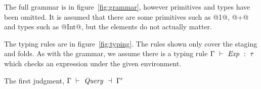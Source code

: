The full grammar is in figure~\ref{fig:grammar}, however primitives and types have been omitted.
It is assumed that there are some primitives such as @1@, @+@ and types such as @Int@, but the elements do not actually matter.

The typing rules are in figure~\ref{fig:typing}.
The rules shown only cover the staging and folds.
As with the grammar, we assume there is a typing rule $\Gamma ~\vdash~ \mathit{Exp}~:~\tau$ which checks an expression under the given environment.

The first judgment, $\TypecheckS{\Gamma}{\mi{Query}}{\Gamma'}$ 

